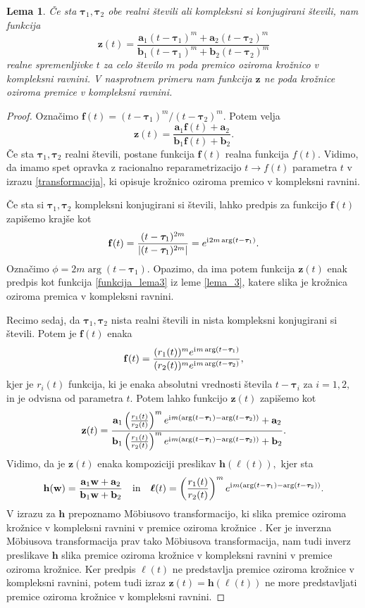 \documentclass[12pt,a4paper,twoside]{article}
\newcommand{\iu}{\mathrm{i}\mkern1mu} %
\theoremstyle{definition} %
\theoremstyle{plain} %
\newtheorem{lema}[definicija]{Lema}
\theoremstyle{primerstyle}
\numberwithin{equation}{section}  %
\newcommand{\aV}{\mathbf{a}}
\newcommand{\bV}{\mathbf{b}}
\newcommand{\fV}{\mathbf{f}}
\newcommand{\hV}{\mathbf{h}}
\newcommand{\wV}{\mathbf{w}}
\newcommand{\zV}{\mathbf{z}}
\newcommand{\btau}{\boldsymbol \tau}
\newcommand{\bell}{\boldsymbol \ell}
\begin{document}
\begin{lema}
	\label{lema_4}
	Če sta $\btau_1,\btau_2$ obe realni števili ali kompleksni si konjugirani števili, nam funkcija
	\begin{equation}
		\label{funkcija_lema4}
		\zV(t)=\frac{\aV_1(t-\btau_1)^m+\aV_2(t-\btau_2)^m}{\bV_1(t-\btau_1)^m+\bV_2(t-\btau_2)^m}
	\end{equation}
	realne spremenljivke $t$ za celo število $m$ poda premico oziroma krožnico v kompleksni ravnini. V nasprotnem primeru nam funkcija $\zV$ ne poda krožnice oziroma premice v kompleksni ravnini.
\end{lema}
\begin{proof}
	Označimo $\fV(t)=(t-\btau_1)^m/(t-\btau_2)^m.$ Potem velja
	\begin{equation*}
		\zV(t)=\frac{\aV_1\fV(t)+\aV_2}{\bV_1\fV(t)+\bV_2}.
	\end{equation*}
	Če sta $\btau_1,\btau_2$ realni števili, postane funkcija $\fV(t)$ realna funkcija $f(t).$ Vidimo, da imamo spet opravka z racionalno reparametrizacijo $t\to f(t)$ parametra $t$ v izrazu \eqref{transformacija}, ki opisuje krožnico oziroma premico v kompleksni ravnini.
	
	Če sta si $\btau_1,\btau_2$ kompleksni konjugirani si števili, lahko predpis za funkcijo $\fV(t)$ zapišemo krajše kot $$\fV(t)=\frac{(t-\btau_1)^{2m}}{|(t-\btau_1)^{2m}|}=e^{\iu2m\arg(t-\btau_1)}.$$ Označimo $\phi=2m\arg(t-\btau_1).$ Opazimo, da ima potem funkcija $\zV(t)$ enak predpis kot funkcija \eqref{funkcija_lema3} iz leme \ref{lema_3}, katere slika je krožnica oziroma premica v kompleksni ravnini.
	
	Recimo sedaj, da $\btau_1,\btau_2$ nista realni števili in nista kompleksni konjugirani si števili. Potem je $\fV(t)$ enaka
	\begin{equation*}
		\fV(t)=\frac{(r_1(t))^me^{\iu m\arg(t-\btau_1)}}{(r_2(t))^me^{\iu m\arg(t-\btau_2)}},
	\end{equation*}
	kjer je $r_i(t)$ funkcija, ki je enaka absolutni vrednosti števila $t-\btau_i$ za $i=1,2,$ in je odvisna od parametra $t.$ Potem lahko funkcijo $\zV(t)$ zapišemo kot
	\begin{equation*}
		\zV(t)=\frac{\aV_1\left(\frac{r_1(t)}{r_2(t)}\right)^me^{\iu m(\arg(t-\btau_1)-\arg(t-\btau_2))}+\aV_2}{\bV_1\left(\frac{r_1(t)}{r_2(t)}\right)^me^{\iu m(\arg(t-\btau_1)-\arg(t-\btau_2))}+\bV_2}.
	\end{equation*}
	Vidimo, da je $\zV(t)$ enaka kompoziciji preslikav $\hV(\bell(t)),$ kjer sta $$\hV(\wV)=\frac{\aV_1\wV+\aV_2}{\bV_1\wV+\bV_2}\quad\text{in}\quad\bell(t)=\left(\frac{r_1(t)}{r_2(t)}\right)^me^{\iu m(\arg(t-\btau_1)-\arg(t-\btau_2))}.$$ V izrazu za $\hV$ prepoznamo Möbiusovo transformacijo, ki slika premice oziroma krožnice v kompleksni ravnini v premice oziroma krožnice \cite[str.\ 148]{needham1998visual}. Ker je inverzna Möbiusova transformacija prav tako Möbiusova transformacija, nam tudi inverz preslikave $\hV$ slika premice oziroma krožnice v kompleksni ravnini v premice oziroma krožnice. Ker predpis $\bell(t)$ ne predstavlja premice oziroma krožnice v kompleksni ravnini, potem tudi izraz $\zV(t)=\hV(\bell(t))$ ne more predstavljati premice oziroma krožnice v kompleksni ravnini. 
\end{proof}
\end{document}
